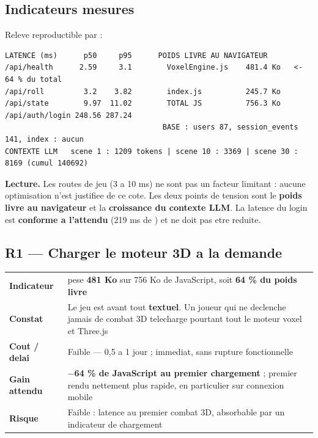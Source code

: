 \subsection{Indicateurs mesures}

Releve reproductible par  :

\begin{lstlisting}[style=sortie]
LATENCE (ms)      p50     p95      POIDS LIVRE AU NAVIGATEUR
/api/health      2.59     3.1        VoxelEngine.js    481.4 Ko   <- 64 % du total
/api/roll         3.2    3.82        index.js          245.7 Ko
/api/state        9.97  11.02        TOTAL JS          756.3 Ko
/api/auth/login 248.56 287.24
                                    BASE : users 87, session_events 141, index : aucun
CONTEXTE LLM   scene 1 : 1209 tokens | scene 10 : 3369 | scene 30 : 8169 (cumul 140692)
\end{lstlisting}

\textbf{Lecture.} Les routes de jeu (3 a 10 ms) ne sont pas un facteur limitant : aucune
optimisation n'est justifiee de ce cote. Les deux points de tension sont le \textbf{poids livre au
navigateur} et la \textbf{croissance du contexte LLM}. La latence du login est \textbf{conforme a
l'attendu} (219 ms de ) et ne doit pas etre reduite.

\subsection{R1 --- Charger le moteur 3D a la demande}

\footnotesize
\begin{tabularx}{\linewidth}{@{}L{2.5cm} X@{}}
\toprule
\textbf{Indicateur} &  pese \textbf{481 Ko} sur 756 Ko de JavaScript, soit \textbf{64 \% du poids livre} \\
\textbf{Constat} & Le jeu est avant tout \textbf{textuel}. Un joueur qui ne declenche jamais de combat 3D telecharge pourtant tout le moteur voxel et Three.js \\
\textbf{Cout / delai} & \textcolor{VertOk}{Faible} --- 0,5 a 1 jour ; immediat, sans rupture fonctionnelle \\
\textbf{Gain attendu} & \textbf{$-$64 \% de JavaScript au premier chargement} ; premier rendu nettement plus rapide, en particulier sur connexion mobile \\
\textbf{Risque} & Faible : latence au premier combat 3D, absorbable par un indicateur de chargement \\
\bottomrule
\end{tabularx}
\normalsize

